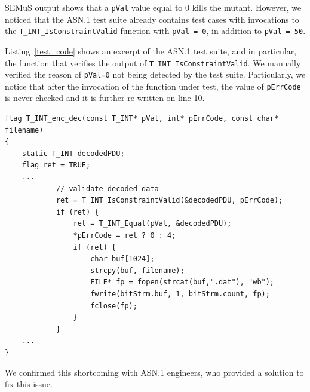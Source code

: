 SEMuS output shows that a \texttt{pVal} value equal to 0 kills the mutant. 
However, we noticed that the ASN.1 test suite already contains test cases with invocations to the \texttt{T\_INT\_IsConstraintValid} function with \texttt{pVal = 0}, in addition to \texttt{pVal = 50}.

Listing~\ref{test_code} shows an excerpt of the ASN.1 test suite, and in particular, the function that verifies the output of \texttt{T\_INT\_IsConstraintValid}. 
We manually verified the reason of \texttt{pVal=0} not being detected by the test suite. Particularly, we notice that after the invocation of the function under test, the value of \texttt{pErrCode} is never checked and it is further re-written on line 10. 

\begin{lstlisting}[style=CStyle, caption=ASN.1 test code., label=test_code]
flag T_INT_enc_dec(const T_INT* pVal, int* pErrCode, const char* filename)
{
    static T_INT decodedPDU;
    flag ret = TRUE;
    ...
            // validate decoded data
            ret = T_INT_IsConstraintValid(&decodedPDU, pErrCode); 
            if (ret) {
                ret = T_INT_Equal(pVal, &decodedPDU);
                *pErrCode = ret ? 0 : 4;
                if (ret) {
                    char buf[1024];
                    strcpy(buf, filename);
                    FILE* fp = fopen(strcat(buf,".dat"), "wb");
                    fwrite(bitStrm.buf, 1, bitStrm.count, fp);
                    fclose(fp);
                }
            }
    ...
}
\end{lstlisting}

We confirmed this shortcoming with ASN.1 engineers, who provided a solution to fix this issue.